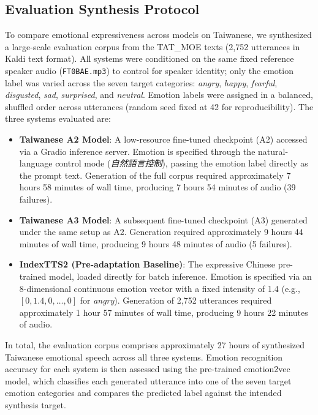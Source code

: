 \subsection{Evaluation Synthesis Protocol}
To compare emotional expressiveness across models on Taiwanese, we synthesized a large-scale evaluation corpus from the TAT\_MOE texts (2,752 utterances in Kaldi text format). All systems were conditioned on the same fixed reference speaker audio (\texttt{FT0BAE.mp3}) to control for speaker identity; only the emotion label was varied across the seven target categories: \textit{angry}, \textit{happy}, \textit{fearful}, \textit{disgusted}, \textit{sad}, \textit{surprised}, and \textit{neutral}. Emotion labels were assigned in a balanced, shuffled order across utterances (random seed fixed at 42 for reproducibility). The three systems evaluated are:
\begin{itemize}
    \item \textbf{Taiwanese A2 Model}: A low-resource fine-tuned checkpoint (A2) accessed via a Gradio inference server. Emotion is specified through the natural-language control mode (\textit{自然語言控制}), passing the emotion label directly as the prompt text. Generation of the full corpus required approximately 7 hours 58 minutes of wall time, producing 7 hours 54 minutes of audio (39 failures).
    \item \textbf{Taiwanese A3 Model}: A subsequent fine-tuned checkpoint (A3) generated under the same setup as A2. Generation required approximately 9 hours 44 minutes of wall time, producing 9 hours 48 minutes of audio (5 failures).
    \item \textbf{IndexTTS2 (Pre-adaptation Baseline)}: The expressive Chinese pre-trained model, loaded directly for batch inference. Emotion is specified via an 8-dimensional continuous emotion vector with a fixed intensity of 1.4 (e.g., $[0, 1.4, 0, \ldots, 0]$ for \textit{angry}). Generation of 2,752 utterances required approximately 1 hour 57 minutes of wall time, producing 9 hours 22 minutes of audio.
\end{itemize}
In total, the evaluation corpus comprises approximately 27 hours of synthesized Taiwanese emotional speech across all three systems. Emotion recognition accuracy for each system is then assessed using the pre-trained emotion2vec model, which classifies each generated utterance into one of the seven target emotion categories and compares the predicted label against the intended synthesis target.